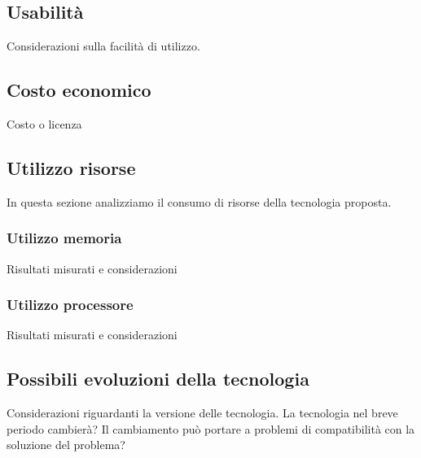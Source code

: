 \documentclass[./../Technology Baseline.tex]{subfiles}
\begin{document}
\subsection{Usabilità}
Considerazioni sulla facilità di utilizzo.
\subsection{Costo economico}
Costo o licenza
\subsection{Utilizzo risorse}
In questa sezione analizziamo il consumo di risorse della tecnologia proposta.
\subsubsection{Utilizzo memoria}
Risultati misurati e considerazioni
\subsubsection{Utilizzo processore}
Risultati misurati e considerazioni
\subsection{Possibili evoluzioni della tecnologia}
Considerazioni riguardanti la versione delle tecnologia.
La tecnologia nel breve periodo cambierà? Il cambiamento può portare a problemi di compatibilità con la soluzione del problema?
\end{document}
